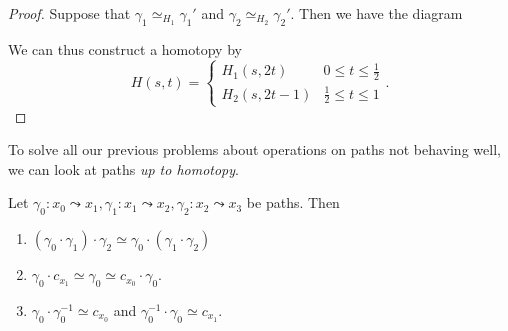 \documentclass[a4paper]{article}
\begin{document}
\begin{proof}
  Suppose that $\gamma_1 \simeq_{H_1}\gamma_1'$ and $\gamma_2\simeq_{H_2}\gamma_2'$. Then we have the diagram
  \begin{center}
  \end{center}
  We can thus construct a homotopy by
  \[
    H(s, t) =
    \begin{cases}
      H_1(s, 2t) & 0 \leq t \leq \frac{1}{2}\\
      H_2(s, 2t - 1) & \frac{1}{2} \leq t \leq 1
    \end{cases}.
  \]
\end{proof}

To solve all our previous problems about operations on paths not behaving well, we can look at paths \emph{up to homotopy}.
\begin{prop}
  Let $\gamma_0: x_0 \leadsto x_1, \gamma_1: x_1 \leadsto x_2, \gamma_2: x_2 \leadsto x_3$ be paths. Then
  \begin{enumerate}
    \item $(\gamma_0 \cdot \gamma_1)\cdot \gamma_2 \simeq \gamma_0 \cdot (\gamma_1\cdot \gamma_2)$
    \item $\gamma_0 \cdot c_{x_1}\simeq \gamma_0 \simeq c_{x_0}\cdot \gamma_0$.
    \item $\gamma_0 \cdot \gamma_0^{-1}\simeq c_{x_0}$ and $\gamma_0^{-1}\cdot \gamma_0 \simeq c_{x_1}$.
  \end{enumerate}
\end{prop}
\end{document}
